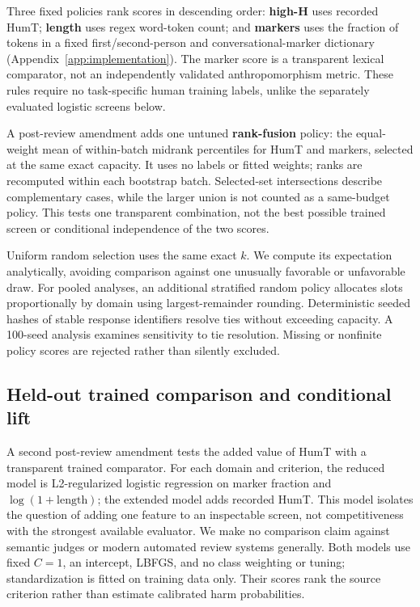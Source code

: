 \documentclass[manuscript,screen,review,anonymous]{acmart}
\begin{document}
Three fixed policies rank scores in descending order: \textbf{high-H} uses recorded HumT; \textbf{length} uses regex word-token count; and \textbf{markers} uses the fraction of tokens in a fixed first/second-person and conversational-marker dictionary (Appendix~\ref{app:implementation}). The marker score is a transparent lexical comparator, not an independently validated anthropomorphism metric. These rules require no task-specific human training labels, unlike the separately evaluated logistic screens below.

A post-review amendment adds one untuned \textbf{rank-fusion} policy: the equal-weight mean of within-batch midrank percentiles for HumT and markers, selected at the same exact capacity. It uses no labels or fitted weights; ranks are recomputed within each bootstrap batch. Selected-set intersections describe complementary cases, while the larger union is not counted as a same-budget policy. This tests one transparent combination, not the best possible trained screen or conditional independence of the two scores.

Uniform random selection uses the same exact $k$. We compute its expectation analytically, avoiding comparison against one unusually favorable or unfavorable draw. For pooled analyses, an additional stratified random policy allocates slots proportionally by domain using largest-remainder rounding. Deterministic seeded hashes of stable response identifiers resolve ties without exceeding capacity. A 100-seed analysis examines sensitivity to tie resolution. Missing or nonfinite policy scores are rejected rather than silently excluded.

\subsection{Held-out trained comparison and conditional lift}
A second post-review amendment tests the added value of HumT with a transparent trained comparator. For each domain and criterion, the reduced model is L2-regularized logistic regression on marker fraction and $\log(1+\mathrm{length})$; the extended model adds recorded HumT. This model isolates the question of adding one feature to an inspectable screen, not competitiveness with the strongest available evaluator. We make no comparison claim against semantic judges or modern automated review systems generally. Both models use fixed $C=1$, an intercept, LBFGS, and no class weighting or tuning; standardization is fitted on training data only. Their scores rank the source criterion rather than estimate calibrated harm probabilities.
\end{document}
